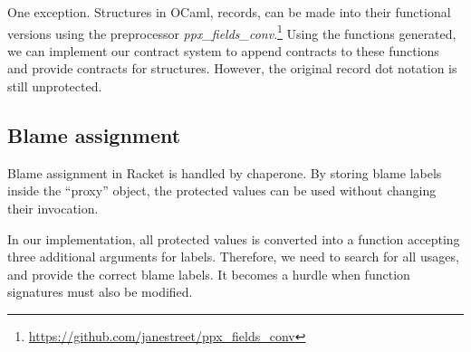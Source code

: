 One exception. Structures in OCaml, records, can be made into their functional versions using the preprocessor \textit{ppx\_fields\_conv}.\footnote{\href{https://github.com/janestreet/ppx\_fields\_conv}{https://github.com/janestreet/ppx\_fields\_conv}} Using the functions generated, we can implement our contract system to append contracts to these functions and provide contracts for structures. However, the original record dot notation is still unprotected.

\subsection{Blame assignment}

Blame assignment in Racket is handled by chaperone. By storing blame labels inside the ``proxy'' object, the protected values can be used without changing their invocation.

In our implementation, all protected values is converted into a function accepting three additional arguments for labels. Therefore, we need to search for all usages, and provide the correct blame labels. It becomes a hurdle when function signatures must also be modified.
